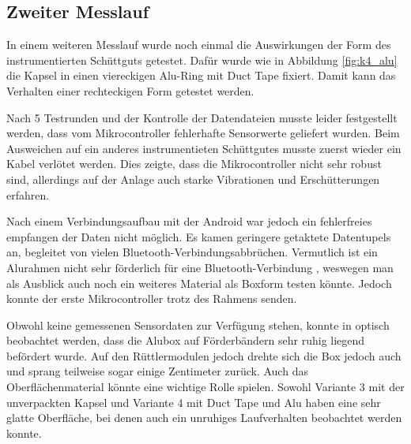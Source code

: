 
\subsection{Zweiter Messlauf}

In einem weiteren Messlauf wurde noch einmal die Auswirkungen der Form des instrumentierten Schüttguts getestet. Dafür wurde wie in Abbildung \ref{fig:k4_alu} die Kapsel in einen viereckigen Alu-Ring  mit Duct Tape fixiert. Damit kann das Verhalten einer rechteckigen Form getestet werden. 


Nach 5 Testrunden und der Kontrolle der Datendateien musste leider festgestellt werden, dass vom Mikrocontroller fehlerhafte Sensorwerte geliefert wurden. Beim Ausweichen auf ein anderes instrumentieten Schüttgutes musste zuerst wieder ein Kabel verlötet werden. Dies zeigte, dass die Mikrocontroller nicht sehr robust sind, allerdings auf der Anlage auch starke Vibrationen und Erschütterungen erfahren.

Nach einem Verbindungsaufbau mit der Android war jedoch ein fehlerfreies empfangen der Daten nicht möglich. Es kamen geringere getaktete Datentupels an, begleitet von vielen Bluetooth-Verbindungsabbrüchen. Vermutlich ist ein Alurahmen nicht sehr förderlich für eine Bluetooth-Verbindung , weswegen man als Ausblick auch noch ein weiteres Material als Boxform testen könnte. Jedoch konnte der erste Mikrocontroller trotz des Rahmens senden. 

Obwohl keine gemessenen Sensordaten zur Verfügung stehen, konnte in optisch beobachtet werden, dass die Alubox auf Förderbändern sehr ruhig liegend befördert wurde. Auf den Rüttlermodulen jedoch drehte sich die Box jedoch auch und sprang teilweise sogar einige Zentimeter zurück. Auch das Oberflächenmaterial könnte eine wichtige Rolle spielen. Sowohl Variante 3 mit der unverpackten Kapsel und Variante 4 mit Duct Tape und Alu haben eine sehr glatte Oberfläche, bei denen auch ein unruhiges Laufverhalten beobachtet werden konnte.


